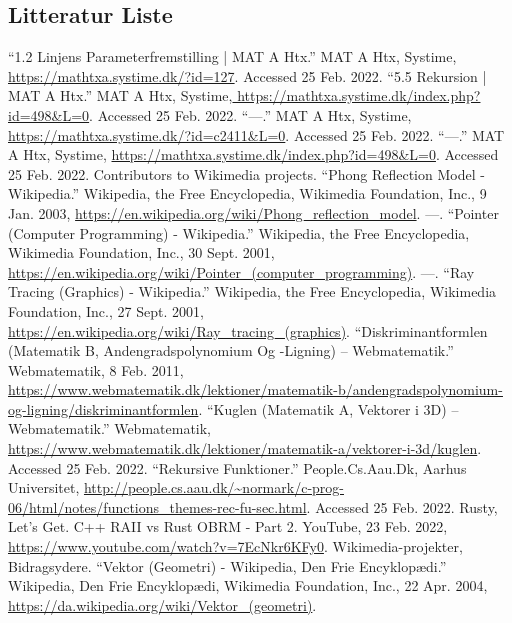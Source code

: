 \documentclass{article}
\begin{document}
\begin{flushleft}
    \newpage

    \section{Litteratur Liste}
    “1.2 Linjens Parameterfremstilling | MAT A Htx.” MAT A Htx, Systime, \url{https://mathtxa.systime.dk/?id=127}. Accessed 25 Feb. 2022.
    “5.5 Rekursion | MAT A Htx.” MAT A Htx, Systime,\url{ https://mathtxa.systime.dk/index.php?id=498&L=0}. Accessed 25 Feb. 2022.
    “---.” MAT A Htx, Systime, \url{https://mathtxa.systime.dk/?id=c2411&L=0}. Accessed 25 Feb. 2022.
    “---.” MAT A Htx, Systime, \url{https://mathtxa.systime.dk/index.php?id=498&L=0}. Accessed 25 Feb. 2022.
    Contributors to Wikimedia projects. “Phong Reflection Model - Wikipedia.” Wikipedia, the Free Encyclopedia, Wikimedia Foundation, Inc., 9 Jan. 2003, \url{https://en.wikipedia.org/wiki/Phong_reflection_model}.
    ---. “Pointer (Computer Programming) - Wikipedia.” Wikipedia, the Free Encyclopedia, Wikimedia Foundation, Inc., 30 Sept. 2001, \url{https://en.wikipedia.org/wiki/Pointer_(computer_programming)}.
    ---. “Ray Tracing (Graphics) - Wikipedia.” Wikipedia, the Free Encyclopedia, Wikimedia Foundation, Inc., 27 Sept. 2001, \url{https://en.wikipedia.org/wiki/Ray_tracing_(graphics)}.
    “Diskriminantformlen (Matematik B, Andengradspolynomium Og -Ligning) – Webmatematik.” Webmatematik, 8 Feb. 2011, \url{https://www.webmatematik.dk/lektioner/matematik-b/andengradspolynomium-og-ligning/diskriminantformlen}.
    “Kuglen (Matematik A, Vektorer i 3D) – Webmatematik.” Webmatematik, \url{https://www.webmatematik.dk/lektioner/matematik-a/vektorer-i-3d/kuglen}. Accessed 25 Feb. 2022.
    “Rekursive Funktioner.” People.Cs.Aau.Dk, Aarhus Universitet, \url{http://people.cs.aau.dk/~normark/c-prog-06/html/notes/functions_themes-rec-fu-sec.html}. Accessed 25 Feb. 2022.
    Rusty, Let’s Get. C++ RAII vs Rust OBRM - Part 2. YouTube, 23 Feb. 2022, \url{https://www.youtube.com/watch?v=7EcNkr6KFy0}.
    Wikimedia-projekter, Bidragsydere. “Vektor (Geometri) - Wikipedia, Den Frie Encyklopædi.” Wikipedia, Den Frie Encyklopædi, Wikimedia Foundation, Inc., 22 Apr. 2004, \url{https://da.wikipedia.org/wiki/Vektor_(geometri)}.


\end{flushleft}
\end{document}

